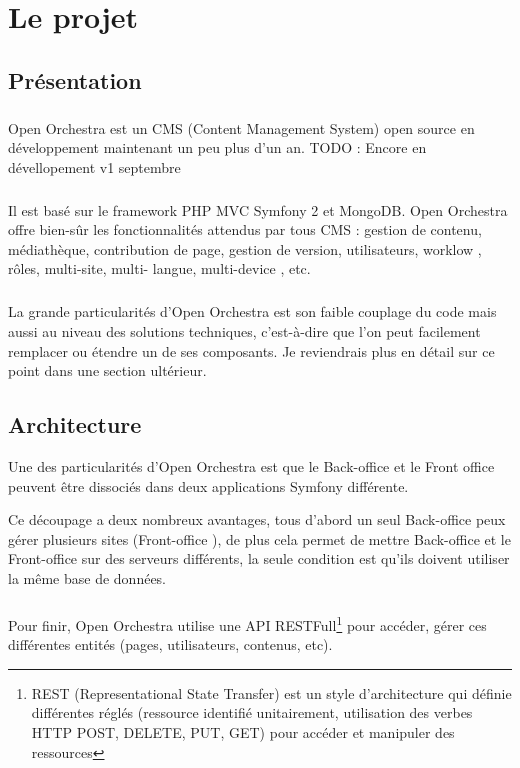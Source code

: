 \chapter{Le projet}
\section{Présentation}
        \paragraph{}
        Open Orchestra est un CMS (Content Management  System) open source en développement maintenant un peu plus d'un an. 
        TODO : Encore en dévellopement v1 septembre
        \paragraph{}
        Il est basé sur le framework PHP MVC Symfony 2 et MongoDB. Open Orchestra offre bien-sûr les fonctionnalités attendus par tous CMS  : gestion de contenu, médiathèque, contribution de page, gestion de version, utilisateurs, \og worklow \fg{}, rôles,  multi-site, multi- langue,  multi-device , etc.
        \paragraph{}
        La grande particularités d'Open Orchestra est son faible couplage du code mais aussi au niveau des solutions techniques, c'est-à-dire que l'on peut facilement remplacer ou étendre un de ses composants. Je reviendrais plus en détail sur ce point dans une section ultérieur.
        
        \section{Architecture}
        Une des particularités d'Open Orchestra est que le \og Back-office \fg{} et le \og Front office \fg{} peuvent être dissociés dans deux applications Symfony différente. 

        Ce découpage a deux nombreux avantages, tous d'abord un seul \og Back-office \fg{}  peux gérer plusieurs sites (\og Front-office \fg{}), de plus cela permet de mettre \og Back-office \fg{} et le \og Front-office \fg{} sur des serveurs différents, la seule condition est qu'ils doivent utiliser la même base de données.
        \paragraph{}
		Pour finir, Open Orchestra utilise une API RESTFull\footnote{REST (Representational State Transfer) est un style d'architecture qui définie différentes réglés (ressource identifié unitairement, utilisation des verbes HTTP POST, DELETE, PUT, GET) pour accéder et manipuler des ressources } pour  accéder, gérer ces différentes entités (pages, utilisateurs, contenus, etc).
